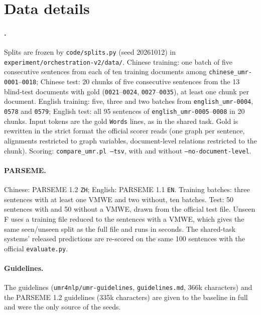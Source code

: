 


\section{Data details}
\label{app:data}

\paragraph{\umr.} Splits are frozen by \texttt{code/splits.py} (seed 20261012) in \texttt{experiment/orchestration-v2/data/}. Chinese training: one batch of five consecutive sentences from each of ten training documents among \texttt{chinese\_umr-0001}--\texttt{0018}; Chinese test: 20 chunks of five consecutive sentences from the 13 blind-test documents with gold (\texttt{0021}--\texttt{0024}, \texttt{0027}--\texttt{0035}), at least one chunk per document. English training: five, three and two batches from \texttt{english\_umr-0004}, \texttt{0578} and \texttt{0579}; English test: all 95 sentences of \texttt{english\_umr-0005}--\texttt{0008} in 20 chunks. Input tokens are the gold \texttt{Words} lines, as in the shared task. Gold is rewritten in the strict format the official scorer reads (one graph per sentence, alignments restricted to graph variables, document-level relations restricted to the chunk). Scoring: \texttt{compare\_umr.pl --tsv}, with and without \texttt{--no-document-level}.

\paragraph{PARSEME.} Chinese: PARSEME 1.2 \texttt{ZH}; English: PARSEME 1.1 \texttt{EN}. Training batches: three sentences with at least one VMWE and two without, ten batches. Test: 50 sentences with and 50 without a VMWE, drawn from the official test file. Unseen F uses a training file reduced to the sentences with a VMWE, which gives the same seen/unseen split as the full file and runs in seconds. The shared-task systems' released predictions are re-scored on the same 100 sentences with the official \texttt{evaluate.py}.

\paragraph{Guidelines.} The \umr guidelines (\texttt{umr4nlp/umr-guidelines}, \texttt{guidelines.md}, 366k characters) and the PARSEME 1.2 guidelines (335k characters) are given to the baseline in full and were the only source of the seeds.

